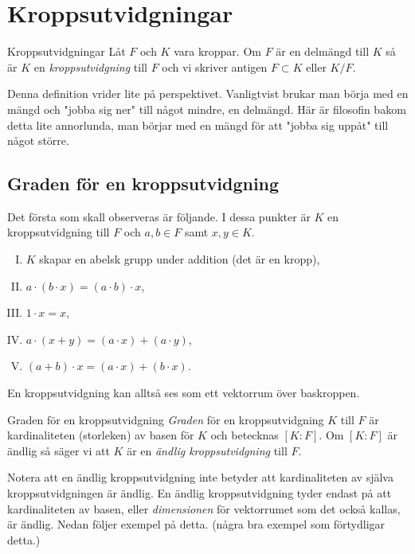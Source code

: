 \documentclass{article}
\theoremstyle{definition}
\begin{document}
\section{Kroppsutvidgningar}
\begin{mydef}{Kroppsutvidgningar}{}
  Låt $F$ och $K$ vara kroppar. Om $F$ är en delmängd till $K$ så är $K$ en \textit{kroppsutvidgning} till $F$ och vi skriver antigen $F \subset K$ eller $K/F$.
\end{mydef}
Denna definition vrider lite på perspektivet. Vanligtvist brukar man börja med en mängd och "jobba sig ner" till något mindre, en delmängd. Här är filosofin bakom detta lite 
annorlunda, man börjar med en mängd för att "jobba sig uppåt" till något större. 

\subsection{Graden för en kroppsutvidgning}
Det första som skall observeras är följande. I dessa punkter är $K$ en kroppsutvidgning till $F$ och $a, b \in F$ samt $x, y \in K$.

\begin{enumerate}[I)]
  \item $K$ skapar en abelsk grupp under addition (det är en kropp),
  \item $a \cdot (b \cdot x) = (a \cdot b) \cdot x$,
  \item $1 \cdot x = x$,
  \item $a \cdot (x + y) = (a \cdot x) + (a \cdot y)$,
  \item $(a + b) \cdot x = (a \cdot x) + (b \cdot x)$.
\end{enumerate}
En kroppsutvidgning kan alltså ses som ett vektorrum över baskroppen. 

\begin{mydef}{Graden för en kroppsutvidgning}{}
  \textit{Graden} för en kroppsutvidgning $K$ till $F$ är kardinaliteten (storleken) av basen för $K$ och betecknas $[K:F]$. Om $[K:F]$ är ändlig så 
  säger vi att $K$ är en \textit{ändlig kroppsutvidgning} till $F$. 
\end{mydef}
Notera att en ändlig kroppsutvidgning inte betyder att kardinaliteten av själva kroppsutvidgningen är ändlig. En ändlig kroppsutvidgning
tyder endast på att kardinaliteten av basen, eller \textit{dimensionen} för vektorrumet som det också kallas, är ändlig. Nedan följer exempel på detta.
(några bra exempel som förtydligar detta.) 
\end{document}
